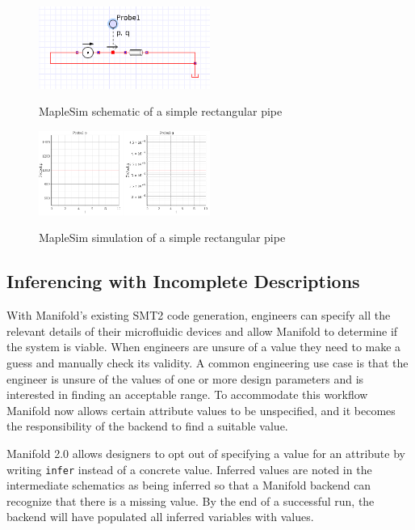 \begin{figure}[!ht]
  \caption{MapleSim schematic of a simple rectangular pipe}
  \centering
    \includegraphics[width=0.5\textwidth]{img/simple-pipe.png}
	\label{fig:pipe-schematic}
\end{figure}
\begin{figure}[!ht]
  \caption{MapleSim simulation of a simple rectangular pipe}
  \centering
    \includegraphics[width=0.5\textwidth]{img/simple-pipe-simulation.png}
	\label{fig:pipe-simulation}
\end{figure}

\subsection{Inferencing with Incomplete Descriptions}

With Manifold's existing SMT2 code generation, engineers can specify all the
relevant details of their microfluidic devices and allow Manifold to determine if the system is viable. When engineers
are unsure of a value they need to make a guess and manually check its
validity. A common engineering use case is that the engineer is unsure of the
values of one or more design parameters and is interested in finding an
acceptable range. To accommodate this workflow Manifold now allows certain
attribute values to be unspecified, and it becomes the
responsibility of the backend to find a suitable value.

Manifold 2.0 allows designers to opt out of
specifying a value for an attribute by writing {\tt infer} instead of a
concrete value. Inferred values are noted in the intermediate schematics as
being inferred so that a Manifold backend can recognize that there is a missing value.
By the end of a successful run, the backend will have populated all inferred variables with values.

